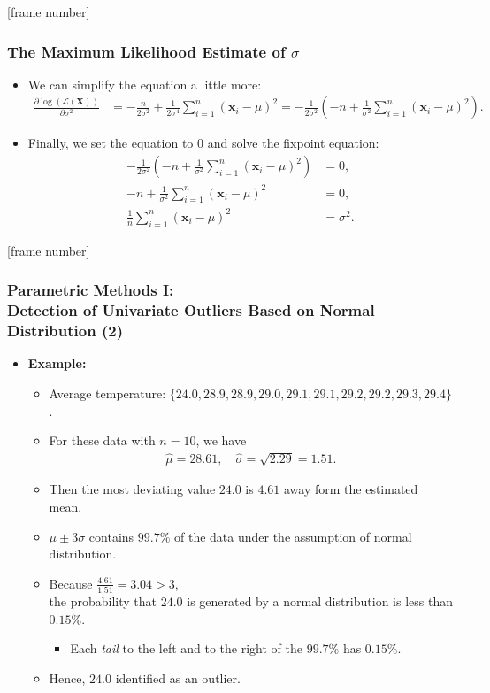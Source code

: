 \documentclass[aspectratio=169,t,xcolor=dvipsnames]{beamer}
\begin{document}
{
[frame number]
\begin{frame}
	\frametitle{The Maximum Likelihood Estimate of $\sigma$}
  \begin{itemize}
    \item We can simplify the equation a little more:
    \begin{align}
      \frac{\partial \log\left(\mathcal{L}(\mathbf{X})\right)}{\partial \sigma^2} &= -\frac{n}{2\sigma^2} + \frac{1}{2\sigma^4} \sum_{i=1}^{n} (\mathbf{x}_i-\mu)^2 = -\frac{1}{2\sigma^2} \left( -n + \frac{1}{\sigma^2} \sum_{i=1}^{n} (\mathbf{x}_i-\mu)^2\right).
    \end{align}
    \item Finally, we set the equation to $0$ and solve the fixpoint equation:
    \begin{align}
      -\frac{1}{2\sigma^2} \left( -n + \frac{1}{\sigma^2} \sum_{i=1}^{n} (\mathbf{x}_i-\mu)^2\right) &= 0, \\
      -n + \frac{1}{\sigma^2} \sum_{i=1}^{n} (\mathbf{x}_i-\mu)^2 &= 0, \\
      \frac{1}{n} \sum_{i=1}^{n} (\mathbf{x}_i-\mu)^2 &= \sigma^2.
    \end{align}
  \end{itemize}
\end{frame}
}

{
[frame number]
\begin{frame}
	\frametitle{Parametric Methods I: \\ Detection of Univariate Outliers Based on Normal Distribution (2)}
	\begin{itemize}
		\item \textbf{Example:}
		      \begin{itemize}
		      	\item Average temperature: $\{24.0, 28.9, 28.9, 29.0, 29.1, 29.1, 29.2, 29.2, 29.3, 29.4\}$.
		      	\item For these data with $n = 10$, we have
            \begin{align}
  		      	   \widehat{\mu}=28.61, \quad \widehat{\sigma}=\sqrt{2.29}=1.51.
            \end{align}
		      	\item Then the most deviating value $24.0$ is $4.61$ away form the estimated mean.
		      	\item $\mu \pm 3\sigma $ contains $99.7\%$ of the data under the assumption of normal distribution.
		      	\item Because $\frac{4.61}{1.51}  =  3.04  >  3$, \\
            the probability that $24.0$ is generated by a normal distribution is less than $0.15\%$.
		      	      \begin{itemize}
		      	      	\item Each \emph{tail} to the left and to the right of the $99.7\%$ has $0.15\%$.
		      	      \end{itemize}
		      	\item Hence, $24.0$ identified as an outlier.
		      \end{itemize}
	\end{itemize}
\end{frame}
}
\end{document}
